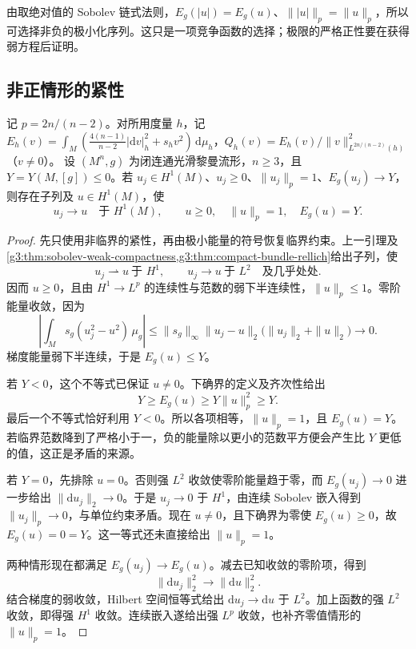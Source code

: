 由取绝对值的 Sobolev 链式法则，\(E_g(|u|)=E_g(u)\)、\(\||u|\|_p=\|u\|_p\)，所以可选择非负的极小化序列。这只是一项竞争函数的选择；极限的严格正性要在获得弱方程后证明。

\subsection{非正情形的紧性}
\label{g3:subsec:2403:02}
\begin{theorem}\label{g3:thm:yamabe-nonpositive-compactness}
	记 \(p=2n/(n-2)\)。对所用度量 \(h\)，记 \(E_h(v)=\int_M(\tfrac{4(n-1)}{n-2}|\mathrm dv|_h^2+s_hv^2)\,\mathrm d\mu_h\)，\(Q_h(v)=E_h(v)/\|v\|_{L^{2n/(n-2)}(h)}^2\)（\(v\ne0\)）。
	设 \((M^n,g)\) 为闭连通光滑黎曼流形，\(n\ge3\)，且 \(Y=Y(M,[g])\le0\)。若 \(u_j\in H^1(M)\)、\(u_j\ge0\)、\(\|u_j\|_p=1\)、\(E_g(u_j)\to Y\)，则存在子列及 \(u\in H^1(M)\)，使
	\[
		u_j\longrightarrow u\quad\text{于 }H^1(M),
		\qquad u\ge0,\quad\|u\|_p=1,\quad E_g(u)=Y.
	\]
\end{theorem}
\begin{proof}
	先只使用非临界的紧性，再由极小能量的符号恢复临界约束。上一引理及\cref{g3:thm:sobolev-weak-compactness,g3:thm:compact-bundle-rellich}给出子列，使
	\[
		u_j\rightharpoonup u\ \text{于 }H^1,
		\qquad u_j\longrightarrow u\ \text{于 }L^2
		\quad\text{及几乎处处}.
	\]
	因而 \(u\ge0\)，且由 \(H^1\to L^p\) 的连续性与范数的弱下半连续性，\(\|u\|_p\le1\)。零阶能量收敛，因为
	\[
		\left|\int_Ms_g(u_j^2-u^2)\,\mu_g\right|
		\le\|s_g\|_\infty\|u_j-u\|_2
		\bigl(\|u_j\|_2+\|u\|_2\bigr)\longrightarrow0.
	\]
	梯度能量弱下半连续，于是 \(E_g(u)\le Y\)。

	若 \(Y<0\)，这个不等式已保证 \(u\ne0\)。下确界的定义及齐次性给出
	\[
		Y\ge E_g(u)\ge Y\|u\|_p^2\ge Y.
	\]
	最后一个不等式恰好利用 \(Y<0\)。所以各项相等，\(\|u\|_p=1\)，且 \(E_g(u)=Y\)。若临界范数降到了严格小于一，负的能量除以更小的范数平方便会产生比 \(Y\) 更低的值，这正是矛盾的来源。

	若 \(Y=0\)，先排除 \(u=0\)。否则强 \(L^2\) 收敛使零阶能量趋于零，而 \(E_g(u_j)\to0\) 进一步给出 \(\|\mathrm du_j\|_2\to0\)。于是 \(u_j\to0\) 于 \(H^1\)，由连续 Sobolev 嵌入得到 \(\|u_j\|_p\to0\)，与单位约束矛盾。现在 \(u\ne0\)，且下确界为零使 \(E_g(u)\ge0\)，故 \(E_g(u)=0=Y\)。这一等式还未直接给出 \(\|u\|_p=1\)。

	两种情形现在都满足 \(E_g(u_j)\to E_g(u)\)。减去已知收敛的零阶项，得到
	\[
		\|\mathrm du_j\|_2^2\longrightarrow\|\mathrm du\|_2^2.
	\]
	结合梯度的弱收敛，Hilbert 空间恒等式给出 \(\mathrm du_j\to\mathrm du\) 于 \(L^2\)。加上函数的强 \(L^2\) 收敛，即得强 \(H^1\) 收敛。连续嵌入遂给出强 \(L^p\) 收敛，也补齐零值情形的 \(\|u\|_p=1\)。
\end{proof}

